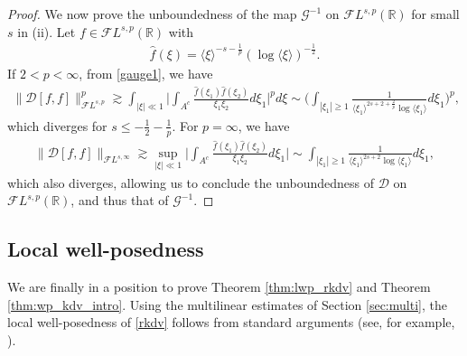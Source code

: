 \documentclass[a4paper,
11pt,  reqno]{amsart}
\newcommand{\jap}[1]{\langle #1 \rangle}
\newcommand{\5}{\textup{V}}
\newcommand{\FL}{\mathcal{F} L}
\newcommand{\ft}{\widehat}
\theoremstyle{remark}
\newcommand{\R}{\mathbb{R}}
\newcommand{\ges}{\gtrsim}
\newcommand{\jb}[1]
{\langle #1 \rangle}
\newcommand{\Gc}{\mathcal{G}}
\numberwithin{equation}{section}
\numberwithin{theorem}{section}
\newcommand{\DD}{\mathcal{D}}
\begin{document}
\begin{proof}
\smallskip


We  now prove the unboundedness of the map $\Gc^{-1}$ on $\FL^{s,p}(\R)$ for small $s$ in (ii). Let $f \in \FL^{s, p}(\R)$ with
\begin{align}
    \ft{f}(\xi) = \jb{\xi}^{-s-\frac1p}(\log \jap{\xi})^{-\frac12}.
\end{align}
If $2 <p <\infty$, from \eqref{gauge1}, we have
\begin{align}
\| \DD[f,f] \|_{\FL^{s,p}}^p
\ges
\int_{|\xi|\ll 1} \bigg| \int_{A^c} \frac{\ft{f}(\xi_1) \ft{f}(\xi_2) }{\xi_1\xi_2} d\xi_1 \bigg|^p d\xi
\sim \bigg( \int_{|\xi_1| \ge 1} \frac{1}{\jb{\xi_1}^{2s+2 + \frac2p  }\log\jap{\xi_1}} d\xi_1\bigg)^p ,
\end{align}
which diverges for $s\le-\frac12 - \frac1p$.
For $p=\infty$, we have
\begin{align}
\| \DD[f,f]\|_{\FL^{s,\infty }}
\ges
\sup_{|\xi| \ll 1}
\bigg| \int_{A^c} \frac{\ft{f}(\xi_1) \ft{f}(\xi_2) }{\xi_1\xi_2} d\xi_1 \bigg|
\sim
\int_{|\xi_1| \ge 1 } \frac{1}{\jb{\xi_1}^{2s+2}\log\jap{\xi_1}} d\xi_1  ,
\end{align}
which also diverges, allowing us to conclude the unboundedness of $\DD$ on $\FL^{s, p}(\R)$, and thus that of $\Gc^{-1}$.
\qedhere

\end{proof}

\subsection{Local well-posedness}
\label{SUBSEC:lwp}




We are finally in a position to prove Theorem \ref{thm:lwp_rkdv} and Theorem \ref{thm:wp_kdv_intro}.
Using the multilinear estimates of Section \ref{sec:multi}, the local well-posedness of \eqref{rkdv} follows from standard arguments (see, for example, \cite{Grunrock_mkdv, HerrGrunrock_FL}).
\end{document}
